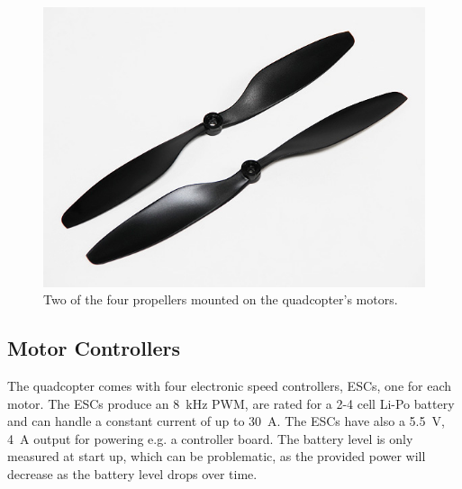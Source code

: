 \begin{figure}[H]
	\centering
	\includegraphics[scale=0.4]{figures/propeller.png}
	\caption{Two of the four propellers mounted on the quadcopter's motors.\cite{HkingPropeller}}
	\label{fig:Propeller}
\end{figure}



\subsection{Motor Controllers}
The quadcopter comes with four electronic speed controllers, ESCs, one for each motor. The ESCs produce an \SI{8}{kHz} PWM, are rated for a 2-4 cell Li-Po battery and can handle a constant current of up to \SI{30}{A}. The ESCs have also a \SI{5.5}{V}, \SI{4}{A} output for powering e.g. a controller board. The battery level is only measured at start up, which can be problematic, as the provided power will decrease as the battery level drops over time.\cite{HKing}

